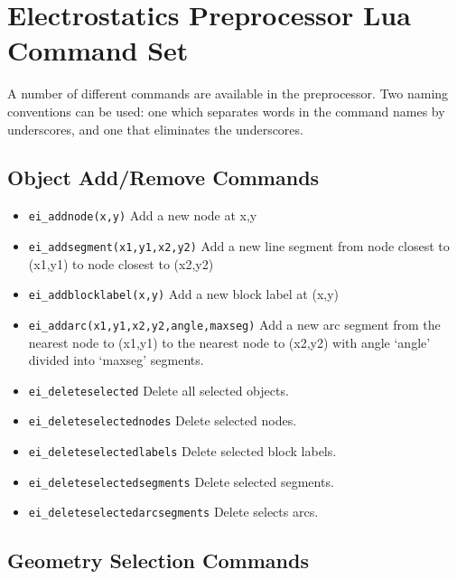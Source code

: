 ﻿\section{Electrostatics Preprocessor Lua Command Set}

A number of different commands are available in the preprocessor.
Two naming conventions can be used: one which separates words in
the command names by underscores, and one that eliminates the
underscores.

\subsection{Object Add/Remove Commands}
\begin{itemize}
\item {\tt ei\_addnode(x,y)} Add a new node at x,y

\item {\tt ei\_addsegment(x1,y1,x2,y2)} Add a new line segment from node closest to
(x1,y1) to node closest to (x2,y2)

\item {\tt ei\_addblocklabel(x,y)} Add a new block label at (x,y)

\item {\tt ei\_addarc(x1,y1,x2,y2,angle,maxseg)} Add a new arc segment from the
nearest node to (x1,y1) to the nearest node to (x2,y2) with angle `angle'
divided into `maxseg' segments.

\item {\tt ei\_deleteselected} Delete all selected objects.

\item {\tt ei\_deleteselectednodes} Delete selected nodes.

\item {\tt ei\_deleteselectedlabels} Delete selected block labels.

\item {\tt ei\_deleteselectedsegments} Delete selected segments.

\item {\tt ei\_deleteselectedarcsegments} Delete selects arcs.
\end{itemize}


\subsection{Geometry Selection Commands}

